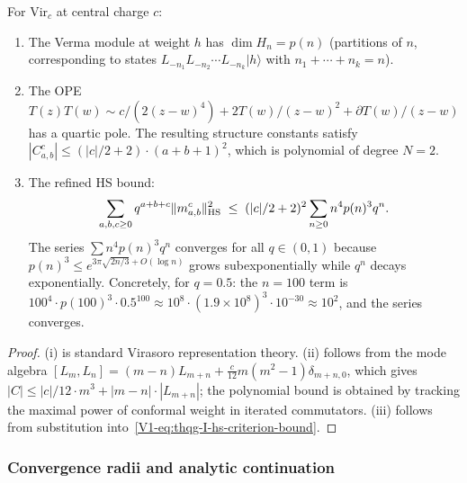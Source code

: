 \begin{proposition}
For $\mathrm{Vir}_c$ at central charge $c$:
\begin{enumerate}[label=\textup{(\roman*)}]
\item The Verma module at weight $h$ has $\dim H_n = p(n)$ (partitions of $n$, corresponding to states $L_{-n_1}L_{-n_2}\cdots L_{-n_k}|h\rangle$ with $n_1 + \cdots + n_k = n$).
\item The OPE $T(z)T(w) \sim c/(2(z-w)^4) + 2T(w)/(z-w)^2 + \partial T(w)/(z-w)$ has a quartic pole. The resulting structure constants satisfy $|C^c_{a,b}| \leq (|c|/2 + 2) \cdot (a+b+1)^2$, which is polynomial of degree $N = 2$.
\item The refined HS bound:
 \begin{equation}%
 \sum_{a,b,c \geq 0} q^{a+b+c} \|m^c_{a,b}\|_{\HS}^2 \;\leq\; (|c|/2 + 2)^2 \sum_{n \geq 0} n^4 p(n)^3 q^n.
 \end{equation}
 The series $\sum n^4 p(n)^3 q^n$ converges for all $q \in (0,1)$ because $p(n)^3 \leq e^{3\pi\sqrt{2n/3} + O(\log n)}$ grows subexponentially while $q^n$ decays exponentially. Concretely, for $q = 0.5$: the $n = 100$ term is $100^4 \cdot p(100)^3 \cdot 0.5^{100} \approx 10^8 \cdot (1.9 \times 10^8)^3 \cdot 10^{-30} \approx 10^{2}$, and the series converges.
\end{enumerate}
\end{proposition}

\begin{proof}
(i) is standard Virasoro representation theory. (ii) follows from the mode algebra $[L_m, L_n] = (m-n)L_{m+n} + \frac{c}{12}m(m^2-1)\delta_{m+n,0}$, which gives $|C| \leq |c|/12 \cdot m^3 + |m-n| \cdot |L_{m+n}|$; the polynomial bound is obtained by tracking the maximal power of conformal weight in iterated commutators. (iii) follows from substitution into~\eqref{V1-eq:thqg-I-hs-criterion-bound}.
\end{proof}

\subsubsection{Convergence radii and analytic continuation}

